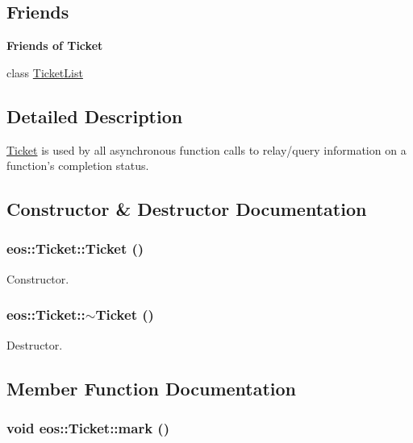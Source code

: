 \subsection*{Friends}
\begin{Indent}{\bf Friends of Ticket}\par
{\em \label{_amgrp33662ca95b7770a7e43fed4bd2b6af89}
 }\begin{DoxyCompactItemize}
\item 
class \hyperlink{classeos_1_1Ticket_ac0aa77ee461a5d61db873f8c71163cb3}{TicketList}
\end{DoxyCompactItemize}
\end{Indent}


\subsection{Detailed Description}
\hyperlink{classeos_1_1Ticket}{Ticket} is used by all asynchronous function calls to relay/query information on a function's completion status. 

\subsection{Constructor \& Destructor Documentation}
\hypertarget{classeos_1_1Ticket_a3d191abdf730fab31d131aeaf3214878}{
\subsubsection[{Ticket}]{\setlength{\rightskip}{0pt plus 5cm}eos::Ticket::Ticket ()}}
\label{classeos_1_1Ticket_a3d191abdf730fab31d131aeaf3214878}


Constructor. \hypertarget{classeos_1_1Ticket_a83323881ce189b387cb1358a2c8c63b0}{
\subsubsection[{$\sim$Ticket}]{\setlength{\rightskip}{0pt plus 5cm}eos::Ticket::$\sim$Ticket ()}}
\label{classeos_1_1Ticket_a83323881ce189b387cb1358a2c8c63b0}


Destructor. 

\subsection{Member Function Documentation}
\hypertarget{classeos_1_1Ticket_a32a1041ca14a3a41b3f5ac9ea040b452}{
\subsubsection[{mark}]{\setlength{\rightskip}{0pt plus 5cm}void eos::Ticket::mark ()}}
\label{classeos_1_1Ticket_a32a1041ca14a3a41b3f5ac9ea040b452}


